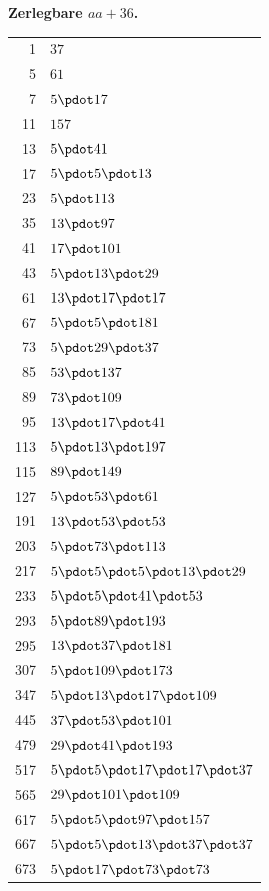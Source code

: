 \par{}
\begin{center}\textbf{Zerlegbare $aa+36$.}\end{center}
\begingroup\small\setlength{\tabcolsep}{5pt}
\begin{longtable}{@{}r|l@{}}
1 & $37$\\
5 & $61$\\
7 & $5\pdot 17$\\
11 & $157$\\
13 & $5\pdot 41$\\
17 & $5\pdot 5\pdot 13$\\
23 & $5\pdot 113$\\
35 & $13\pdot 97$\\
41 & $17\pdot 101$\\
43 & $5\pdot 13\pdot 29$\\
61 & $13\pdot 17\pdot 17$\\
67 & $5\pdot 5\pdot 181$\\
73 & $5\pdot 29\pdot 37$\\
85 & $53\pdot 137$\\
89 & $73\pdot 109$\\
95 & $13\pdot 17\pdot 41$\\
113 & $5\pdot 13\pdot 197$\\
115 & $89\pdot 149$\\
127 & $5\pdot 53\pdot 61$\\
191 & $13\pdot 53\pdot 53$\\
203 & $5\pdot 73\pdot 113$\\
217 & $5\pdot 5\pdot 5\pdot 13\pdot 29$\\
233 & $5\pdot 5\pdot 41\pdot 53$\\
293 & $5\pdot 89\pdot 193$\\
295 & $13\pdot 37\pdot 181$\\
307 & $5\pdot 109\pdot 173$\\
347 & $5\pdot 13\pdot 17\pdot 109$\\
445 & $37\pdot 53\pdot 101$\\
479 & $29\pdot 41\pdot 193$\\
517 & $5\pdot 5\pdot 17\pdot 17\pdot 37$\\
565 & $29\pdot 101\pdot 109$\\
617 & $5\pdot 5\pdot 97\pdot 157$\\
667 & $5\pdot 5\pdot 13\pdot 37\pdot 37$\\
673 & $5\pdot 17\pdot 73\pdot 73$\\

\end{longtable}
